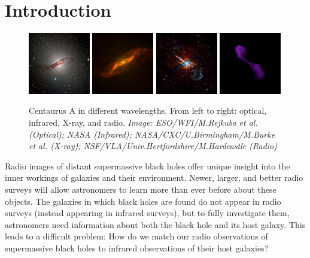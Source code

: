 
\chapter{Introduction}
\label{cha:intro}

\begin{figure}
  \centering
  \includegraphics[width=0.24\textwidth]{images/centaurus_a_optical}
  \includegraphics[width=0.24\textwidth]{images/centaurus_a_infrared}
  \includegraphics[width=0.24\textwidth]{images/centaurus_a_xray}
  \includegraphics[width=0.24\textwidth]{images/centaurus_a_radio}
  \caption{Centaurus A in different wavelengths. From left to right: optical,
    infrared, X-ray, and radio. \emph{Image: ESO/WFI/M.Rejkuba et al. (Optical);
    NASA (Infrared); NASA/CXC/U.Birmingham/M.Burke et al. (X-ray);
    NSF/VLA/Univ.Hertfordshire/M.Hardcastle (Radio)}}
  \label{fig:different-wavelengths}
\end{figure}

Radio images of distant supermassive black holes offer unique insight into the
inner workings of galaxies and their environment. Newer, larger, and better
radio surveys will allow astronomers to learn more than ever before about these
objects. The galaxies in which black holes are found do not appear in radio
surveys (instead appearing in infrared surveys), but to fully investigate them,
astronomers need information about both the black hole and its host galaxy. This
leads to a difficult problem: How do we match our radio observations of
supermassive black holes to infrared observations of their host galaxies?

